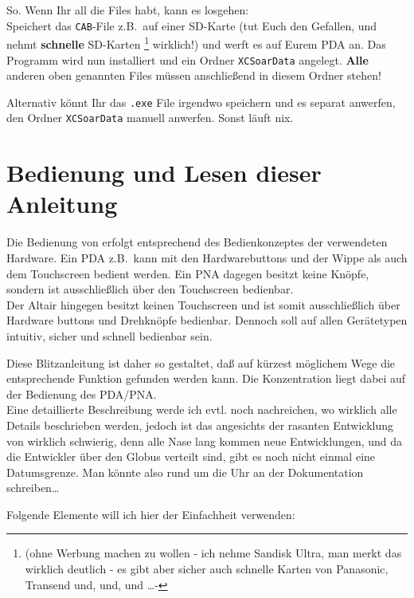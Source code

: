 So. Wenn Ihr all die Files habt, kann es losgehen:\\[1em]

Speichert das \texttt{CAB}-File z.B.\ auf einer SD-Karte (tut Euch den Gefallen, und nehmt \textbf{schnelle} SD-Karten \footnote{(ohne Werbung machen zu wollen - ich nehme Sandisk Ultra, man merkt das wirklich deutlich - es gibt aber sicher auch schnelle Karten von Panasonic, Transend  und, und, und \dots - } wirklich!) und werft es \merkes auf Eurem \textsf{PDA} an. Das Programm wird  nun installiert und ein Ordner \texttt{XCSoarData} angelegt. \textbf{Alle} anderen oben genannten Files müssen anschließend in diesem Ordner stehen!

Alternativ könnt Ihr das \texttt{.exe} File irgendwo speichern und es separat anwerfen,
den Ordner \texttt{XCSoarData} manuell anwerfen. Sonst läuft nix.
%
\section{Bedienung und Lesen dieser Anleitung}
Die Bedienung von \xc erfolgt entsprechend des Bedienkonzeptes der verwendeten Hardware.
Ein \textsf{PDA} z.B.\ kann mit den Hardwarebuttons und der Wippe als auch dem Touchscreen
bedient werden. Ein \textsf{PNA} dagegen besitzt keine Knöpfe, sondern ist ausschließlich über den Touchscreen bedienbar. \\

Der \textsf{Altair} hingegen besitzt keinen Touchscreen und ist somit ausschließlich über Hardware buttons und Drehknöpfe bedienbar. Dennoch soll \xc auf allen Gerätetypen intuitiv, sicher und schnell bedienbar sein.

Diese Blitzanleitung ist daher so gestaltet, daß auf kürzest möglichem Wege die entsprechende Funktion gefunden werden kann. Die Konzentration liegt dabei auf der Bedienung des \textsf{PDA/PNA}.\\

Eine detaillierte Beschreibung werde ich evtl. noch nachreichen, wo wirklich alle Details beschrieben werden, jedoch ist das angesichts der rasanten Entwicklung von \xc wirklich schwierig, denn alle Nase lang kommen neue Entwicklungen, und da die Entwickler über den Globus verteilt sind, gibt es noch nicht einmal eine Datumsgrenze. Man könnte also rund um die Uhr an der Dokumentation   schreiben\dots


Folgende Elemente will ich hier der Einfachheit verwenden:

